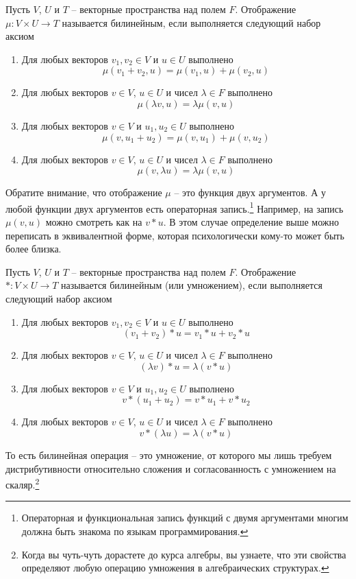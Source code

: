 \begin{definition}
Пусть $V$, $U$ и $T$ -- векторные пространства над полем $F$. Отображение $\mu\colon V\times U \to T$ называется билинейным, если выполняется следующий набор аксиом
\begin{enumerate}
\item Для любых векторов $v_1,v_2\in V$ и $u\in U$ выполнено
\[
\mu(v_1 + v_2, u) = \mu(v_1, u) + \mu(v_2, u)
\]
\item Для любых векторов $v\in V$, $u\in U$ и чисел $\lambda \in F$ выполнено
\[
\mu(\lambda v, u) = \lambda \mu(v, u)
\]
\item Для любых векторов $v\in V$ и $u_1,u_2\in U$ выполнено
\[
\mu(v, u_1 + u_2) = \mu(v, u_1) + \mu(v, u_2)
\]
\item Для любых векторов $v\in V$, $u\in U$ и чисел $\lambda \in F$ выполнено
\[
\mu(v, \lambda u) = \lambda \mu(v, u)
\]
\end{enumerate}
\end{definition}

Обратите внимание, что отображение $\mu$ -- это функция двух аргументов. А у любой функции двух аргументов есть операторная запись.\footnote{Операторная и функциональная запись функций с двумя аргументами многим должна быть знакома по языкам программирования.} Например, на запись $\mu(v, u) $ можно смотреть как на $v * u$. В этом случае определение выше можно переписать в эквивалентной форме, которая психологически кому-то может быть более близка.
\begin{definition}
Пусть $V$, $U$ и $T$ -- векторные пространства над полем $F$. Отображение $*\colon V\times U \to T$ называется билинейным (или умножением), если выполняется следующий набор аксиом
\begin{enumerate}
\item Для любых векторов $v_1,v_2\in V$ и $u\in U$ выполнено
\[
(v_1 + v_2) * u = v_1 * u + v_2 * u
\]
\item Для любых векторов $v\in V$, $u\in U$ и чисел $\lambda \in F$ выполнено
\[
(\lambda v)*u = \lambda (v * u)
\]
\item Для любых векторов $v\in V$ и $u_1,u_2\in U$ выполнено
\[
v * (u_1 + u_2) = v * u_1 + v * u_2
\]
\item Для любых векторов $v\in V$, $u\in U$ и чисел $\lambda \in F$ выполнено
\[
v *(\lambda u) = \lambda (v * u)
\]
\end{enumerate}
\end{definition}
То есть билинейная операция -- это умножение, от которого мы лишь требуем дистрибутивности относительно сложения и согласованность с умножением на скаляр.\footnote{Когда вы чуть-чуть дорастете до курса алгебры, вы узнаете, что эти свойства определяют любую операцию умножения в алгебраических структурах.}

